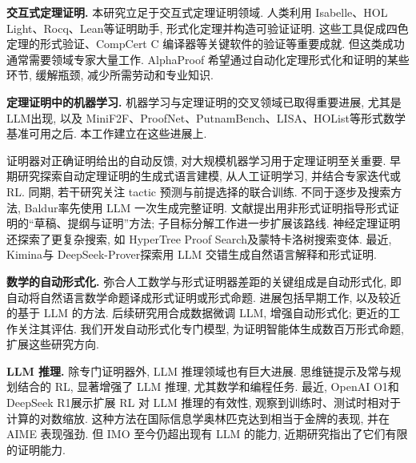 \label{alphaproof-methods-related}
\noindent\textbf{交互式定理证明.} 本研究立足于交互式定理证明领域. 人类利用 Isabelle\cite{alphaproof-ref29}、HOL Light\cite{alphaproof-ref30}、Rocq\cite{alphaproof-ref31}、Lean\cite{alphaproof-ref1}等证明助手, 形式化定理并构造可验证证明. 这些工具促成四色定理的形式验证\cite{alphaproof-ref32}、CompCert C 编译器\cite{alphaproof-ref33}等关键软件的验证等重要成就. 但这类成功通常需要领域专家大量工作. AlphaProof 希望通过自动化定理形式化和证明的某些环节, 缓解瓶颈, 减少所需劳动和专业知识.

\noindent\textbf{定理证明中的机器学习.} 机器学习与定理证明的交叉领域已取得重要进展, 尤其是 LLM\cite{alphaproof-ref34,alphaproof-ref35,alphaproof-ref36}出现, 以及 MiniF2F\cite{alphaproof-ref20}、ProofNet\cite{alphaproof-ref37}、PutnamBench\cite{alphaproof-ref21}、LISA\cite{alphaproof-ref38}、HOList\cite{alphaproof-ref39}等形式数学基准可用之后. 本工作建立在这些进展上.

证明器对正确证明给出的自动反馈, 对大规模机器学习用于定理证明至关重要. 早期研究\cite{alphaproof-ref13,alphaproof-ref24,alphaproof-ref40,alphaproof-ref41}探索自动定理证明的生成式语言建模, 从人工证明学习, 并结合专家迭代或 RL. 同期, 若干研究\cite{alphaproof-ref14,alphaproof-ref42,alphaproof-ref43,alphaproof-ref44}关注 tactic 预测与前提选择的联合训练. 不同于逐步及搜索方法, Baldur\cite{alphaproof-ref45}率先使用 LLM 一次生成完整证明. 文献\cite{alphaproof-ref46}提出用非形式证明指导形式证明的“草稿、提纲与证明”方法; 子目标分解工作\cite{alphaproof-ref47}进一步扩展该路线. 神经定理证明还探索了更复杂搜索, 如 HyperTree Proof Search\cite{alphaproof-ref17}及蒙特卡洛树搜索变体\cite{alphaproof-ref48,alphaproof-ref49}. 最近, Kimina\cite{alphaproof-ref25}与 DeepSeek-Prover\cite{alphaproof-ref26}探索用 LLM 交错生成自然语言解释和形式证明.

\noindent\textbf{数学的自动形式化.} 弥合人工数学与形式证明器差距的关键组成是自动形式化, 即自动将自然语言数学命题译成形式证明或形式命题. 进展包括早期工作\cite{alphaproof-ref50,alphaproof-ref51}, 以及较近的基于 LLM 的方法\cite{alphaproof-ref52,alphaproof-ref53,alphaproof-ref54}. 后续研究用合成数据微调 LLM, 增强自动形式化\cite{alphaproof-ref49,alphaproof-ref55,alphaproof-ref56}; 更近的工作关注其评估\cite{alphaproof-ref57,alphaproof-ref58}. 我们开发自动形式化专门模型, 为证明智能体生成数百万形式命题, 扩展这些研究方向.

\noindent\textbf{LLM 推理.} 除专门证明器外, LLM 推理领域也有巨大进展. 思维链提示\cite{alphaproof-ref59}及常与规划结合的 RL, 显著增强了 LLM 推理, 尤其数学和编程任务\cite{alphaproof-ref60}. 最近, OpenAI O1\cite{alphaproof-ref61}和 DeepSeek R1\cite{alphaproof-ref9}展示扩展 RL 对 LLM 推理的有效性, 观察到训练时、测试时相对于计算的对数缩放. 这种方法在国际信息学奥林匹克达到相当于金牌的表现\cite{alphaproof-ref62}, 并在 AIME 表现强劲. 但 IMO 至今仍超出现有 LLM 的能力, 近期研究指出了它们有限的证明能力\cite{alphaproof-ref11,alphaproof-ref12}.

